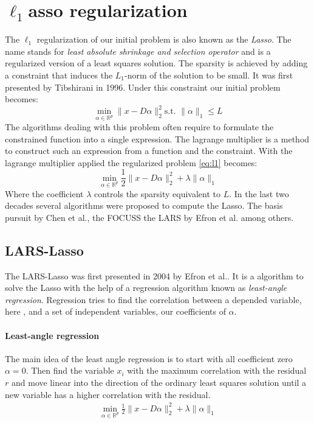 \section { $\ell_1$asso regularization}
The $\ell_1$ regularization of our initial problem is also known as the
\emph{Lasso}. The name stands for \emph{least absolute shrinkage and
selection operator} and is a regularized version of a least squares
solution. The sparsity is achieved by adding a constraint that induces
the $L_1$-norm of the solution to be small. It was first presented by Tibshirani
in 1996\cite{Tibshirani1996}. Under this constraint our initial problem becomes:
\begin{equation}
\min_{\alpha\in\mathbb{R}^{p}} \lVert x - D\alpha \rVert^{2}_{2} \textrm{
s.t. } \lVert \alpha \rVert_{1} \leq L \label{eq:l1}
\end{equation}
The algorithms dealing with this problem often require to formulate the
constrained function into a single expression. The lagrange multiplier is a
method to construct such an expression from a function and the constraint. With
the  lagrange multiplier applied the regularized problem \ref{eq:l1} becomes:
\begin{equation}
\min_{\alpha\in\mathbb{R}^{p}}  \frac{1}{2} \lVert x - D\alpha \rVert^{2}_{2} +
\lambda \lVert \alpha \rVert_{1}\label{eq:l1lagrange}
\end{equation}
Where the coefficient $\lambda$ controls the sparsity equivalent to $L$.
In the last two decades several algorithms were proposed to compute the
Lasso. The basis pursuit by Chen et al.\cite{Chen1995}, the FOCUSS\cite{FOCUSS}
the LARS by Efron et al.\cite{Efron2004} among others.


\subsection {LARS-Lasso}
\label{sec:lars}
The LARS-Lasso was first presented in 2004 by Efron et al.\cite{Efron2004}.
It is a algorithm to solve the Lasso with the help of a regression
algorithm known as \emph{least-angle regression}. Regression tries to find the
correlation between a depended variable, here , and a
set of independent variables, our coefficients of $\alpha$.

\paragraph{Least-angle regression}
The main idea of the least angle regression is to start with all coefficient
zero $\alpha = 0$. Then find the variable $x_i$ with the maximum correlation
with the residual $r$ and move linear into the direction of the ordinary least
squares solution until a new variable has a higher correlation with the
residual.  
\begin{align}
\min_{\alpha\in\mathbb{R}^{p}}  \frac{1}{2} \lVert x - D\alpha \rVert^{2}_{2} +
\lambda \lVert \alpha \rVert_{1}
\end{align}


